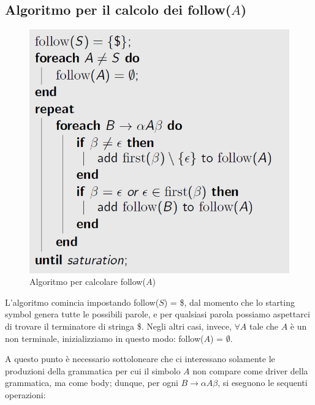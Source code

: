 \documentclass[class=book, crop=false, oneside, 12pt]{standalone}
\begin{document}
\subsection{Algoritmo per il calcolo dei follow(\(A\))}

\begin{figure}[H]
    \centering
    \includegraphics[width=.7\textwidth,keepaspectratio]{follow-algorithm.png}
    \caption{Algoritmo per calcolare follow(\(A\))}
    \label{follow-algorithm}
\end{figure}

L'algoritmo comincia impostando follow(\(S\)) = \$, dal momento che lo starting symbol genera tutte le possibili parole, e per qualsiasi parola possiamo aspettarci di trovare il terminatore di stringa \$. Negli altri casi, invece, \(\forall A\) tale che \(A\) è un non terminale, inizializziamo in questo modo: follow(\(A\)) = \(\emptyset\).

A questo punto è necessario sottoloneare che ci interessano solamente le produzioni della grammatica per cui il simbolo \(A\) non compare come driver della grammatica, ma come body; dunque, per ogni \(B \rightarrow \alpha A \beta\), si eseguono le sequenti operazioni: 
\end{document}
